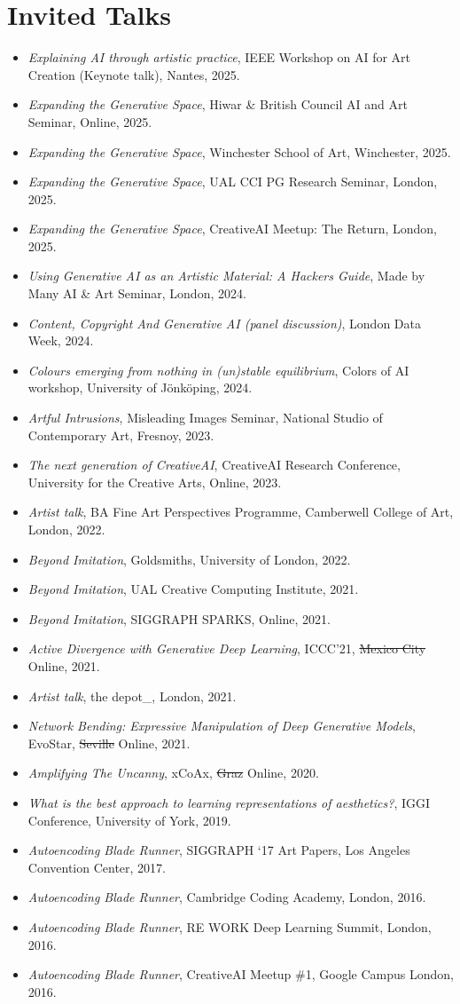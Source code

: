 \documentclass[letterpaper,11pt]{article}
\newcommand{\resumeItem}[2]{
  \item\small{
    \textbf{#1}{ #2 \vspace{-2pt}}
  }
}
\newcommand{\resumeSubItem}[2]{\resumeItem{#1}{#2}\vspace{-4pt}}
\newcommand{\resumeSubHeadingListStart}{\begin{itemize}[leftmargin=*]}
\newcommand{\resumeSubHeadingListEnd}{\end{itemize}}
\begin{document}
\section{Invited Talks}
 \resumeSubHeadingListStart
 \resumeSubItem{}{\textit{Explaining AI through artistic practice}, IEEE Workshop on AI for Art Creation (Keynote talk), Nantes, 2025.}
 \resumeSubItem{}{\textit{Expanding the Generative Space}, Hiwar \& British Council AI and Art Seminar, Online, 2025.}
 \resumeSubItem{}{\textit{Expanding the Generative Space}, Winchester School of Art, Winchester, 2025.}
 \resumeSubItem{}{\textit{Expanding the Generative Space}, UAL CCI PG Research Seminar, London, 2025.}
 \resumeSubItem{}{\textit{Expanding the Generative Space}, CreativeAI Meetup: The Return, London, 2025.}
 \resumeSubItem{}{\textit{Using Generative AI as an Artistic Material: A Hackers Guide}, Made by Many AI \& Art Seminar, London, 2024.}
 \resumeSubItem{}{\textit{Content, Copyright And Generative AI (panel discussion)}, London Data Week, 2024.}
\resumeSubItem{}{\textit{Colours emerging from nothing in \textit{(un)stable equilibrium}}, Colors of AI workshop, University of Jönköping, 2024.}
 \resumeSubItem{}{\textit{Artful Intrusions}, Misleading Images Seminar, National Studio of Contemporary Art, Fresnoy, 2023.}
  \resumeSubItem{}{\textit{The next generation of CreativeAI}, CreativeAI Research Conference, University for the Creative Arts, Online, 2023.}
  \resumeSubItem{}{\textit{Artist talk}, BA Fine Art Perspectives Programme, Camberwell College of Art, London, 2022.}
  \resumeSubItem{}{\textit{Beyond Imitation}, Goldsmiths, University of London, 2022.}
  \resumeSubItem{}{\textit{Beyond Imitation}, UAL Creative Computing Institute, 2021.}
  \resumeSubItem{}{\textit{Beyond Imitation}, SIGGRAPH SPARKS, Online, 2021.}
  \resumeSubItem{}{\textit{Active Divergence with Generative Deep Learning}, ICCC'21, \sout{Mexico City} Online, 2021.}
  \resumeSubItem{}{\textit{Artist talk}, the depot\_, London, 2021.}
  \resumeSubItem{}{\textit{Network Bending: Expressive Manipulation of Deep Generative Models}, EvoStar, \sout{Seville} Online, 2021.}
  \resumeSubItem{}{\textit{Amplifying The Uncanny}, xCoAx, \sout{Graz} Online, 2020.}
  \resumeSubItem{}{\textit{What is the best approach to learning representations of aesthetics?}, IGGI Conference, University of York, 2019.}
  \resumeSubItem{}{\textit{Autoencoding Blade Runner}, SIGGRAPH `17 Art Papers, Los Angeles Convention Center, 2017.}
  \resumeSubItem{}{\textit{Autoencoding Blade Runner}, Cambridge Coding Academy, London, 2016.}
  \resumeSubItem{}{\textit{Autoencoding Blade Runner}, RE WORK Deep Learning Summit, London, 2016.}  
  \resumeSubItem{}{\textit{Autoencoding Blade Runner},  CreativeAI Meetup \#1, Google Campus London, 2016.}  
 \resumeSubHeadingListEnd
 
\end{document}
